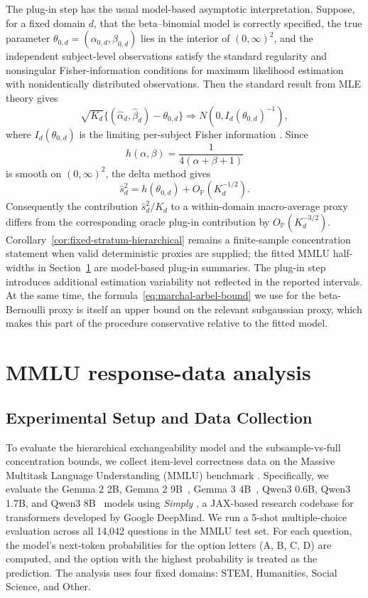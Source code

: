 \documentclass[11pt]{article}
\theoremstyle{definition}
\theoremstyle{remark}
\begin{document}
The plug-in step has the usual model-based asymptotic interpretation.  Suppose, for a fixed domain \(d\), that the beta--binomial model is correctly specified, the true parameter \(\theta_{0,d}=(\alpha_{0,d},\beta_{0,d})\) lies in the interior of \((0,\infty)^2\), and the independent subject-level observations satisfy the standard regularity and nonsingular Fisher-information conditions for maximum likelihood estimation with nonidentically distributed observations.  Then the standard result from MLE theory gives
\[
    \sqrt{K_d}\{(\hat\alpha_d,\hat\beta_d)-\theta_{0,d}\}
    \Rightarrow
    N(0,I_d(\theta_{0,d})^{-1}),
\]
where \(I_d(\theta_{0,d})\) is the limiting per-subject Fisher information \citet{vandervaart1998asymptotic}.  Since
\[
    h(\alpha,\beta)=\frac{1}{4(\alpha+\beta+1)}
\]
is smooth on \((0,\infty)^2\), the delta method gives
\[
    \widehat s_d^2
    =
    h(\theta_{0,d})+O_{\mathbb P}(K_d^{-1/2}).
\]
Consequently the contribution \(\widehat s_d^2/K_d\) to a within-domain macro-average proxy differs from the corresponding oracle plug-in contribution by \(O_{\mathbb P}(K_d^{-3/2})\). Corollary~\ref{cor:fixed-stratum-hierarchical} remains a finite-sample concentration statement when valid deterministic proxies are supplied; the fitted MMLU half-widths in Section~\ref{sec:mmlu} are model-based plug-in summaries. The plug-in step introduces additional estimation variability not reflected in the reported intervals. At the same time, the formula~\ref{eq:marchal-arbel-bound} we use for the beta-Bernoulli proxy is itself an upper bound on the relevant subgaussian proxy, which makes this part of the procedure conservative relative to the fitted model.



\section{MMLU response-data analysis}\label{sec:mmlu}


\subsection{Experimental Setup and Data Collection}
To evaluate the hierarchical exchangeability model and the subsample-vs-full concentration bounds, we collect item-level correctness data on the Massive Multitask Language Understanding (MMLU) benchmark \citep{hendrycks2020measuring}. Specifically, we evaluate the Gemma 2 2B, Gemma 2 9B~\citep{gemma2_2024}, Gemma 3 4B~\citep{gemma3_2025}, Qwen3 0.6B, Qwen3 1.7B, and Qwen3 8B~\cite{qwen3_2025} models using \textit{Simply} \citep{Liang2025Simply}, a JAX-based research codebase for transformers developed by Google DeepMind.
We run a 5-shot multiple-choice evaluation across all 14,042 questions in the MMLU test set. For each question, the model's next-token probabilities for the option letters (A, B, C, D) are computed, and the option with the highest probability is treated as the prediction.  The analysis uses four fixed domains: STEM, Humanities, Social Science, and Other.
\end{document}
